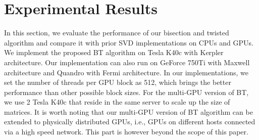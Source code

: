 \vspace{-0.15in}
\section{Experimental Results} \label{sec:results}
\vspace{-0.1in}
In this section, we evaluate the performance of our bisection and twisted algorithm and compare it with prior SVD implementations on CPUs and GPUs.
We implement the proposed BT algorithm on Tesla K40c with Kerpler architecture. 
Our implementation can also run on GeForce 750Ti with Maxwell architecture and Quandro with Fermi architecture.
In our implementations, we set the number of threads per GPU block as 512, which brings the better performance than other possible block sizes.
For the multi-GPU version of BT, we use 2 Tesla K40c that reside in the same server to scale up the size of matrices. 
It is worth noting that our multi-GPU version of BT algorithm can be extended to physically distributed GPUs, i.e., GPUs on different hosts connected via a high speed network. 
This part is however beyond the scope of this paper. 

